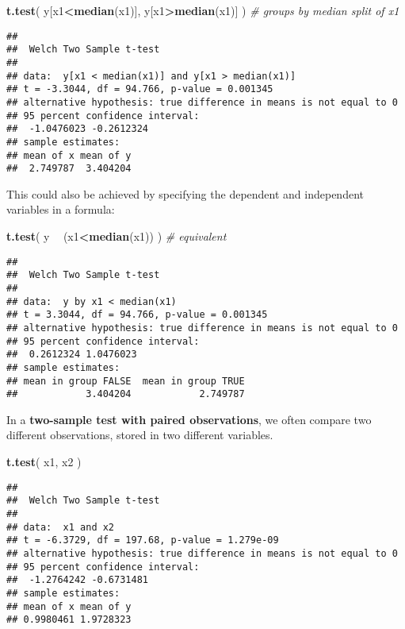 \documentclass[]{book}
\newenvironment{Shaded}{\begin{snugshade}}{\end{snugshade}}
\newcommand{\CommentTok}[1]{\textcolor[rgb]{0.56,0.35,0.01}{\textit{#1}}}
\newcommand{\KeywordTok}[1]{\textcolor[rgb]{0.13,0.29,0.53}{\textbf{#1}}}
\newcommand{\NormalTok}[1]{#1}
\newcommand{\OperatorTok}[1]{\textcolor[rgb]{0.81,0.36,0.00}{\textbf{#1}}}
\newcommand{\StringTok}[1]{\textcolor[rgb]{0.31,0.60,0.02}{#1}}
\begin{document}
\begin{Shaded}
\begin{Highlighting}[]
\KeywordTok{t.test}\NormalTok{( y[x1}\OperatorTok{<}\KeywordTok{median}\NormalTok{(x1)], y[x1}\OperatorTok{>}\KeywordTok{median}\NormalTok{(x1)] ) }\CommentTok{# groups by median split of x1}
\end{Highlighting}
\end{Shaded}

\begin{verbatim}
## 
##  Welch Two Sample t-test
## 
## data:  y[x1 < median(x1)] and y[x1 > median(x1)]
## t = -3.3044, df = 94.766, p-value = 0.001345
## alternative hypothesis: true difference in means is not equal to 0
## 95 percent confidence interval:
##  -1.0476023 -0.2612324
## sample estimates:
## mean of x mean of y 
##  2.749787  3.404204
\end{verbatim}

This could also be achieved by specifying the dependent and
independent variables in a formula:

\begin{Shaded}
\begin{Highlighting}[]
\KeywordTok{t.test}\NormalTok{( y }\OperatorTok{~}\StringTok{ }\NormalTok{(x1}\OperatorTok{<}\KeywordTok{median}\NormalTok{(x1)) ) }\CommentTok{# equivalent}
\end{Highlighting}
\end{Shaded}

\begin{verbatim}
## 
##  Welch Two Sample t-test
## 
## data:  y by x1 < median(x1)
## t = 3.3044, df = 94.766, p-value = 0.001345
## alternative hypothesis: true difference in means is not equal to 0
## 95 percent confidence interval:
##  0.2612324 1.0476023
## sample estimates:
## mean in group FALSE  mean in group TRUE 
##            3.404204            2.749787
\end{verbatim}

In a \textbf{two-sample test with paired observations}, we often compare two
different observations, stored in two different variables.

\begin{Shaded}
\begin{Highlighting}[]
\KeywordTok{t.test}\NormalTok{( x1, x2 )}
\end{Highlighting}
\end{Shaded}

\begin{verbatim}
## 
##  Welch Two Sample t-test
## 
## data:  x1 and x2
## t = -6.3729, df = 197.68, p-value = 1.279e-09
## alternative hypothesis: true difference in means is not equal to 0
## 95 percent confidence interval:
##  -1.2764242 -0.6731481
## sample estimates:
## mean of x mean of y 
## 0.9980461 1.9728323
\end{verbatim}
\end{document}
